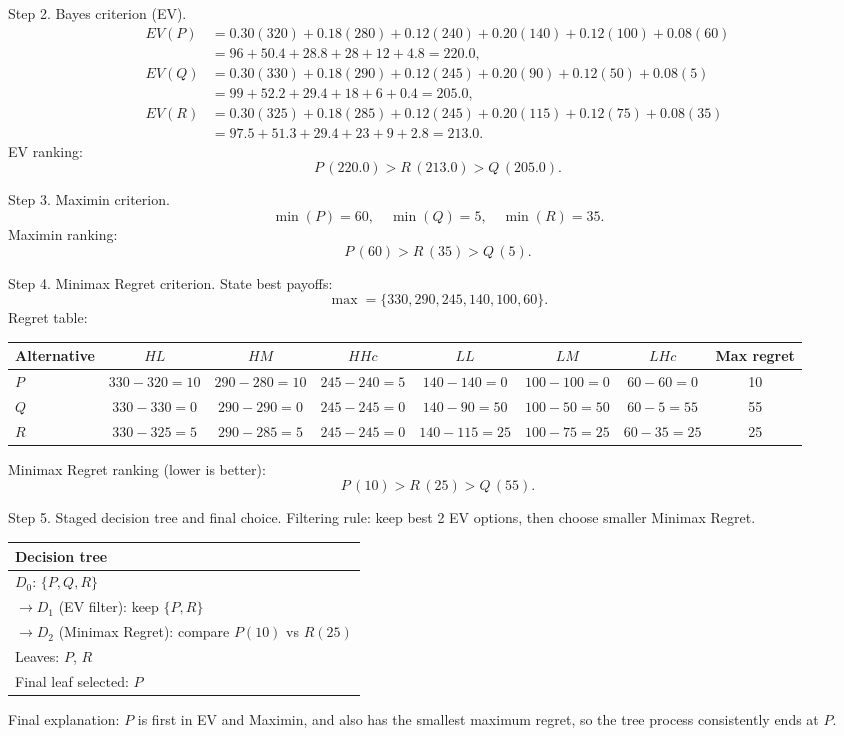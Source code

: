 \begin{ExamProblems}
		Step 2. Bayes criterion (EV).
		\[
		\begin{aligned}
		EV(P)&=0.30(320)+0.18(280)+0.12(240)+0.20(140)+0.12(100)+0.08(60)\\
		&=96+50.4+28.8+28+12+4.8=220.0,\\
		EV(Q)&=0.30(330)+0.18(290)+0.12(245)+0.20(90)+0.12(50)+0.08(5)\\
		&=99+52.2+29.4+18+6+0.4=205.0,\\
		EV(R)&=0.30(325)+0.18(285)+0.12(245)+0.20(115)+0.12(75)+0.08(35)\\
		&=97.5+51.3+29.4+23+9+2.8=213.0.
		\end{aligned}
		\]
		EV ranking:
		\[
		P\,(220.0)>R\,(213.0)>Q\,(205.0).
		\]

		Step 3. Maximin criterion.
		\[
		\min(P)=60,\quad \min(Q)=5,\quad \min(R)=35.
		\]
		Maximin ranking:
		\[
		P\,(60)>R\,(35)>Q\,(5).
		\]

		Step 4. Minimax Regret criterion.
		State best payoffs:
		\[
		\max=\{330,290,245,140,100,60\}.
		\]
		Regret table:
		\begin{center}
			\begin{tabular}{l c c c c c c c}
				\toprule
				Alternative & $HL$ & $HM$ & $HHc$ & $LL$ & $LM$ & $LHc$ & Max regret \\
				\midrule
				$P$ & $330-320=10$ & $290-280=10$ & $245-240=5$ & $140-140=0$ & $100-100=0$ & $60-60=0$ & 10 \\
				$Q$ & $330-330=0$ & $290-290=0$ & $245-245=0$ & $140-90=50$ & $100-50=50$ & $60-5=55$ & 55 \\
				$R$ & $330-325=5$ & $290-285=5$ & $245-245=0$ & $140-115=25$ & $100-75=25$ & $60-35=25$ & 25 \\
				\bottomrule
			\end{tabular}
		\end{center}
		Minimax Regret ranking (lower is better):
		\[
		P\,(10)>R\,(25)>Q\,(55).
		\]

		Step 5. Staged decision tree and final choice.
		Filtering rule: keep best 2 EV options, then choose smaller Minimax Regret.
		\begin{center}
			\begin{tabular}{l}
				\toprule
				Decision tree \\
				\midrule
				$D_0$: $\{P,Q,R\}$ \\
				$\rightarrow D_1$ (EV filter): keep $\{P,R\}$ \\
				$\rightarrow D_2$ (Minimax Regret): compare $P(10)$ vs $R(25)$ \\
				Leaves: $P$, $R$ \\
				Final leaf selected: $P$ \\
				\bottomrule
			\end{tabular}
		\end{center}
		Final explanation: $P$ is first in EV and Maximin, and also has the smallest maximum regret, so the tree process consistently ends at $P$.


\end{ExamProblems}
